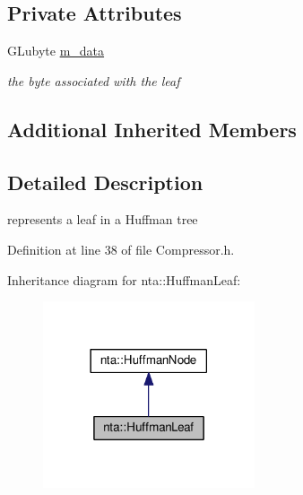 \subsection*{Private Attributes}
\begin{DoxyCompactItemize}
\item 
\mbox{\label{classnta_1_1HuffmanLeaf_a1a02d12c1ee80e4d3686fb05a0d140b0}} 
G\+Lubyte \hyperlink{classnta_1_1HuffmanLeaf_a1a02d12c1ee80e4d3686fb05a0d140b0}{m\+\_\+data}
\begin{DoxyCompactList}\small\item\em the byte associated with the leaf \end{DoxyCompactList}\end{DoxyCompactItemize}
\subsection*{Additional Inherited Members}


\subsection{Detailed Description}
represents a leaf in a Huffman tree 

Definition at line 38 of file Compressor.\+h.



Inheritance diagram for nta\+:\+:Huffman\+Leaf\+:
\nopagebreak
\begin{figure}[H]
\begin{center}
\leavevmode
\includegraphics[width=177pt]{df/d39/classnta_1_1HuffmanLeaf__inherit__graph}
\end{center}
\end{figure}


